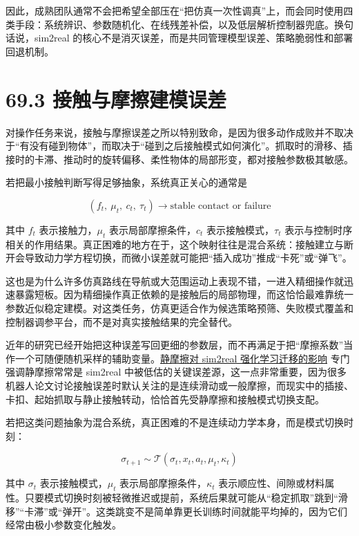 因此，成熟团队通常不会把希望全部压在“把仿真一次性调真”上，而会同时使用四类手段：系统辨识、参数随机化、在线残差补偿，以及低层解析控制器兜底。换句话说，sim2real 的核心不是消灭误差，而是共同管理模型误差、策略脆弱性和部署回退机制。

\section*{69.3 接触与摩擦建模误差}


对操作任务来说，接触与摩擦误差之所以特别致命，是因为很多动作成败并不取决于“有没有碰到物体”，而取决于“碰到之后接触模式如何演化”。抓取时的滑移、插接时的卡滞、推动时的旋转偏移、柔性物体的局部形变，都对接触参数极其敏感。

若把最小接触判断写得足够抽象，系统真正关心的通常是

\begingroup
\footnotesize
\begin{equation*}
(f_t,\ \mu_t,\ c_t,\ \tau_t) \rightarrow \text{stable contact or failure}
\end{equation*}
\endgroup

其中 \(f_t\) 表示接触力，\(\mu_t\) 表示局部摩擦条件，\(c_t\) 表示接触模式，\(\tau_t\) 表示与控制时序相关的作用结果。真正困难的地方在于，这个映射往往是混合系统：接触建立与断开会导致动力学方程切换，而微小误差就可能把“插入成功”推成“卡死”或“弹飞”。

这也是为什么许多仿真路线在导航或大范围运动上表现不错，一进入精细操作就迅速暴露短板。因为精细操作真正依赖的是接触后的局部物理，而这恰恰最难靠统一参数近似稳定建模。对这类任务，仿真更适合作为候选策略预筛、失败模式覆盖和控制器调参平台，而不是对真实接触结果的完全替代。

近年的研究已经开始把这种误差写回更细的参数层，而不再满足于把“摩擦系数”当作一个可随便随机采样的辅助变量。\href{https://arxiv.org/abs/2503.01255}{静摩擦对 sim2real 强化学习迁移的影响} 专门强调静摩擦常常是 sim2real 中被低估的关键误差源，这一点非常重要，因为很多机器人论文讨论接触误差时默认关注的是连续滑动或一般摩擦，而现实中的插接、卡扣、起始抓取与静止接触转动，恰恰首先受静摩擦和接触模式切换支配。

若把这类问题抽象为混合系统，真正困难的不是连续动力学本身，而是模式切换时刻：

\begingroup
\footnotesize
\begin{equation*}
\sigma_{t+1} \sim \mathcal{T}(\sigma_t, x_t, a_t, \mu_t, \kappa_t)
\end{equation*}
\endgroup

其中 \(\sigma_t\) 表示接触模式，\(\mu_t\) 表示局部摩擦条件，\(\kappa_t\) 表示顺应性、间隙或材料属性。只要模式切换时刻被轻微推迟或提前，系统后果就可能从“稳定抓取”跳到“滑移”“卡滞”或“弹开”。这类跳变不是简单靠更长训练时间就能平均掉的，因为它们经常由极小参数变化触发。

